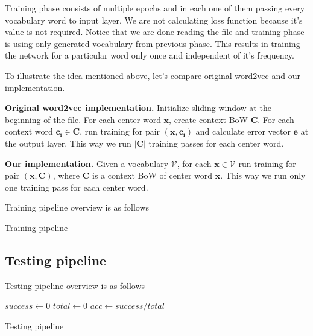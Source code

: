 \documentclass{article}
\newcommand{\SetAlgoStyle}{
	\SetAlgoNoLine
	\SetAlgoNoEnd
	\DontPrintSemicolon
}
\begin{document}
Training phase consists of multiple epochs and in each one of them passing
every vocabulary word to input layer. We are not calculating loss function
because it's value is not required. Notice that we are done reading the file
and training phase is using only generated vocabulary from previous phase.
This results in training the network for a particular word only once and
independent of it's frequency.

\medbreak

To illustrate the idea mentioned above, let's compare original word2vec and our implementation.

\textbf{Original word2vec implementation.}
Initialize sliding window at the beginning of the file. For each center word $\boldsymbol{x}$, create context BoW $\boldsymbol{C}$. For each context word $\boldsymbol{c_i} \in \boldsymbol{C}$, run training for pair $(\boldsymbol{x}, \boldsymbol{c_i})$ and calculate error vector $\boldsymbol{e}$ at the output layer. This way we run $|\boldsymbol{C}|$ training passes for each center word.

\textbf{Our implementation.}
Given a vocabulary $\mathcal{V}$, for each $\boldsymbol{x} \in \mathcal{V}$ run training for pair $(\boldsymbol{x}, \boldsymbol{C})$, where $\boldsymbol{C}$ is a context BoW of center word $\boldsymbol{x}$. This way we run only one training pass for each center word.

Training pipeline overview is as follows

\begin{algorithm}[H]
	\SetAlgoStyle
	\caption{Training pipeline}
\end{algorithm}

\subsection{Testing pipeline}

Testing pipeline overview is as follows

\begin{algorithm}[H]
	\SetAlgoStyle
	$success \gets 0$\;
	$total \gets 0$\;
	$acc \gets success / total$\;
	\caption{Testing pipeline}
\end{algorithm}
\end{document}
